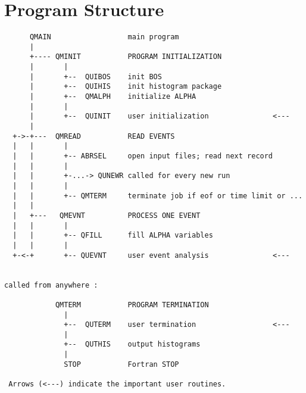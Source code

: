 \chapter{\label{sec-PSTRUC}Program Structure}
\par
\begin{verbatim}
      QMAIN                  main program
      |
      +---- QMINIT           PROGRAM INITIALIZATION
      |       |
      |       +--  QUIBOS    init BOS
      |       +--  QUIHIS    init histogram package
      |       +--  QMALPH    initialize ALPHA
      |       |
      |       +--  QUINIT    user initialization               <---
      |
  +->-+---  QMREAD           READ EVENTS
  |   |       |
  |   |       +-- ABRSEL     open input files; read next record
  |   |       |
  |   |       +-...-> QUNEWR called for every new run
  |   |       |
  |   |       +-- QMTERM     terminate job if eof or time limit or ...
  |   |
  |   +---   QMEVNT          PROCESS ONE EVENT
  |   |       |
  |   |       +-- QFILL      fill ALPHA variables
  |   |       |
  +-<-+       +-- QUEVNT     user event analysis               <---
 
 
called from anywhere :
 
            QMTERM           PROGRAM TERMINATION
              |
              +--  QUTERM    user termination                  <---
              |
              +--  QUTHIS    output histograms
              |
              STOP           Fortran STOP
 
 Arrows (<---) indicate the important user routines.
\end{verbatim}
